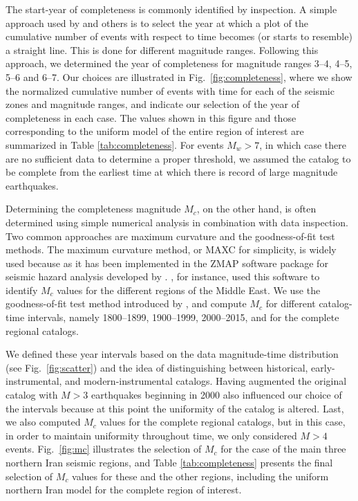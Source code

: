 The start-year of completeness is commonly identified by inspection. A simple approach used by \citet{Frankel1995} and others is to select the year at which a plot of the cumulative number of events with respect to time becomes (or starts to resemble) a straight line. This is done for different magnitude ranges. Following this approach, we determined the year of completeness for magnitude ranges 3--4, 4--5, 5--6 and 6--7. Our choices are illustrated in Fig.~\ref{fig:completeness}, where we show the normalized cumulative number of events with time for each of the seismic zones and magnitude ranges, and indicate our selection of the year of completeness in each case. The values shown in this figure and those corresponding to the uniform model of the entire region of interest are summarized in Table \ref{tab:completeness}. For events $M_w>7$, in which case there are no sufficient data to determine a proper threshold, we assumed the catalog to be complete from the earliest time at which there is record of large magnitude earthquakes. 

Determining the completeness magnitude $M_c$, on the other hand, is often determined using simple numerical analysis in combination with data inspection. Two common approaches are maximum curvature and the goodness-of-fit test methods. The maximum curvature method, or MAXC for simplicity, is widely used because as it has been implemented in the ZMAP software package for seismic hazard analysis developed by \citet{Wiemer2001}. \citet{Zare2014}, for instance, used this software to identify $M_c$ values for the different regions of the Middle East. We use the goodness-of-fit test method introduced by \citet{Wiemer2000}, and compute $M_c$ for different catalog-time intervals, namely 1800--1899, 1900--1999, 2000--2015, and for the complete regional catalogs.

We defined these year intervals based on the data magnitude-time distribution (see Fig.~\ref{fig:scatter}) and the idea of distinguishing between historical, early-instrumental, and modern-instrumental catalogs. Having augmented the original catalog with $M>3$ earthquakes beginning in 2000 also influenced our choice of the intervals because at this point the uniformity of the catalog is altered. Last, we also computed $M_c$ values for the complete regional catalogs, but in this case, in order to maintain uniformity throughout time, we only considered $M>4$ events. Fig.~\ref{fig:mc} illustrates the selection of $M_c$ for the case of the main three northern Iran seismic regions, and Table \ref{tab:completeness} presents the final selection of $M_c$ values for these and the other regions, including the uniform northern Iran model for the complete region of interest.

